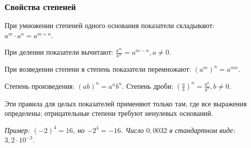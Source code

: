 \documentclass[12pt,a4paper]{article}
\theoremstyle{definition}
\theoremstyle{plain}
\theoremstyle{remark}
\begin{document}
\subsubsection*{Свойства степеней}
При умножении степеней одного основания показатели складывают: \(a^{m} \cdot  a^{n} = a^{m + n}\).\par
При делении показатели вычитают: \(\frac{a^{m}}{a^{n}} = a^{m - n},\allowbreak a \ne  0\).\par
При возведении степени в степень показатели перемножают: \((a^{m})^{n} = a^{mn}\).\par
Степень произведения: \((ab)^{n} = a^{n} b^{n}\). Степень дроби: \((\frac{a}{b})^{n} = \frac{a^{n}}{b^{n}},\allowbreak b \ne  0\).\par
Эти правила для целых показателей применяют только там, где все выражения определены; отрицательные степени требуют ненулевых оснований.\par
{\small\textit{Пример: \((- 2)^{4} = 16\), но \(- 2^{4} = - 16\). Число \(0,0032\) в стандартном виде: \(3{,}2 \cdot  10^{- 3}\).}}\par
\end{document}
